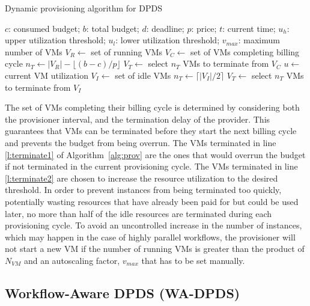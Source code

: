 \documentclass{sig-alternate}
\begin{document}
\begin{algorithm}[tb]
\caption{Dynamic provisioning algorithm for DPDS}
\label{alg:prov}
\begin{algorithmic}[1]
\Require $c$: consumed budget; $b$: total budget; $d$: deadline; $p$: price;
$t$: current time; $u_h$: upper utilization threshold; $u_l$: lower utilization
threshold; $v_{max}$: maximum number of VMs
	\State $V_R\gets$ set of running VMs
    \State $V_C\gets$ set of VMs completing billing cycle
    	\State $n_T\gets |V_R| - \lfloor(b-c)/p\rfloor$
    	\State $V_T\gets$ select $n_T$ VMs to terminate from $V_C$
    	\State {} \label{l:terminate1}
    \Else 
		\State $u\gets$ current VM utilization
    		\State {}
    		\State $V_I\gets$ set of idle VMs
    		\State $n_T\gets \lceil|V_I|/2\rceil$ \label{l:nT2}
			\State $V_T\gets$ select $n_T$ VMs to terminate from $V_I$
    		\State {} \label{l:terminate2}
    	\EndIf 
    \EndIf
\EndProcedure
\end{algorithmic} 
\end{algorithm}

The set of VMs completing their billing cycle is determined by considering both the
provisioner interval, and the termination delay of the provider. This guarantees 
that VMs can be terminated before they start the next billing cycle and prevents the
budget from being overrun. The VMs terminated in line \ref{l:terminate1} of Algorithm~\ref{alg:prov} are the ones 
that would overrun the budget if not terminated in the current provisioning cycle. 
The VMs terminated in line \ref{l:terminate2} are chosen to increase the resource
utilization to the desired threshold. In order to prevent instances from being
terminated too quickly, potentially wasting resources that have already been paid for
but could be used later, no more than half of the idle resources are terminated during
each provisioning cycle. To avoid an uncontrolled increase in the number of
instances, which may happen in the case of highly parallel workflows, the provisioner 
will not start a new VM if the number of running VMs is greater than the product of
$N_{VM}$ and an autoscaling factor, $v_{max}$ that has to be set manually.


\subsection{Workflow-Aware DPDS (WA-DPDS)}
\end{document}
